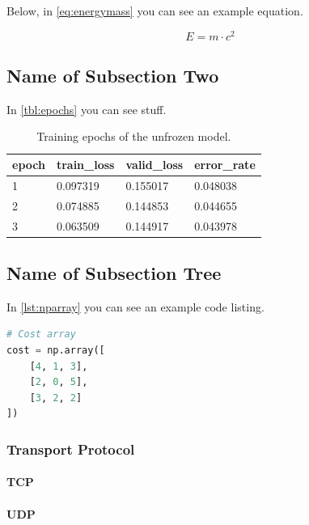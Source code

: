 \lipsum[5]
Below, in \autoref{eq:energymass} you can see an example equation.

\begin{equation}
    E = m \cdot c^2
    \label{eq:energymass}
\end{equation}

\lipsum[5]

\subsection{Name of Subsection Two}

\lipsum[5]
In \autoref{tbl:epochs} you can see stuff.

\begin{table}[h]
    \centering
    \caption{Training epochs of the unfrozen model.}
    \begin{tabular}{p{}p{}p{}p{}}
        \toprule
        epoch & train\_loss & valid\_loss & error\_rate \\
        \midrule
        1 & 0.097319 & 0.155017 & 0.048038 \\
        2 & 0.074885 & 0.144853 & 0.044655 \\
        3 & 0.063509 & 0.144917 & 0.043978 \\
        \bottomrule
    \end{tabular}
    \label{tbl:epochs}
\end{table}

\lipsum[5]

\subsection{Name of Subsection Tree}

\lipsum[5]
\lipsum[5]
In \autoref{lst:nparray} you can see an example code listing.

\begin{lstlisting}[label=lst:nparray, language=Python, caption=Problem Conditions in Python]
# Cost array
cost = np.array([
	[4, 1, 3],
	[2, 0, 5],
	[3, 2, 2]
])
\end{lstlisting}

\lipsum

\subsubsection{Transport Protocol}

\lipsum[5]

\paragraph{TCP}

\lipsum[5]

\paragraph{UDP}

\lipsum[5]
